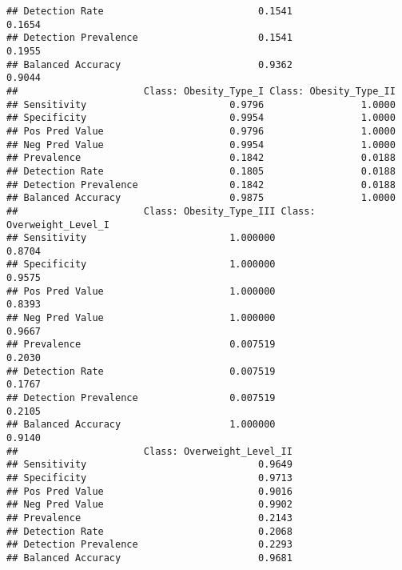 \documentclass[
]{article}
\newenvironment{Shaded}{\begin{snugshade}}{\end{snugshade}}
\newcommand{\AttributeTok}[1]{\textcolor[rgb]{0.13,0.29,0.53}{#1}}
\newcommand{\ConstantTok}[1]{\textcolor[rgb]{0.56,0.35,0.01}{#1}}
\newcommand{\DecValTok}[1]{\textcolor[rgb]{0.00,0.00,0.81}{#1}}
\newcommand{\FunctionTok}[1]{\textcolor[rgb]{0.13,0.29,0.53}{\textbf{#1}}}
\newcommand{\NormalTok}[1]{#1}
\newcommand{\SpecialCharTok}[1]{\textcolor[rgb]{0.81,0.36,0.00}{\textbf{#1}}}
\newcommand{\StringTok}[1]{\textcolor[rgb]{0.31,0.60,0.02}{#1}}
\begin{document}
\begin{verbatim}
## Detection Rate                           0.1541               0.1654
## Detection Prevalence                     0.1541               0.1955
## Balanced Accuracy                        0.9362               0.9044
##                      Class: Obesity_Type_I Class: Obesity_Type_II
## Sensitivity                         0.9796                 1.0000
## Specificity                         0.9954                 1.0000
## Pos Pred Value                      0.9796                 1.0000
## Neg Pred Value                      0.9954                 1.0000
## Prevalence                          0.1842                 0.0188
## Detection Rate                      0.1805                 0.0188
## Detection Prevalence                0.1842                 0.0188
## Balanced Accuracy                   0.9875                 1.0000
##                      Class: Obesity_Type_III Class: Overweight_Level_I
## Sensitivity                         1.000000                    0.8704
## Specificity                         1.000000                    0.9575
## Pos Pred Value                      1.000000                    0.8393
## Neg Pred Value                      1.000000                    0.9667
## Prevalence                          0.007519                    0.2030
## Detection Rate                      0.007519                    0.1767
## Detection Prevalence                0.007519                    0.2105
## Balanced Accuracy                   1.000000                    0.9140
##                      Class: Overweight_Level_II
## Sensitivity                              0.9649
## Specificity                              0.9713
## Pos Pred Value                           0.9016
## Neg Pred Value                           0.9902
## Prevalence                               0.2143
## Detection Rate                           0.2068
## Detection Prevalence                     0.2293
## Balanced Accuracy                        0.9681
\end{verbatim}

\begin{Shaded}
\end{Shaded}
\end{document}
